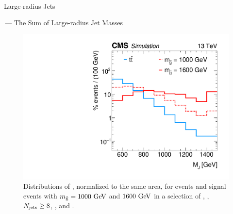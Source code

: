 \begin{section}{Large-radius Jets}
\begin{subsection}{\MJ\,--- The Sum of Large-radius Jet Masses}
\begin{figure}[tbp!]
\centering
\includegraphics[angle=0,width=0.80\columnwidth]{fig/mj_distributions.pdf}
\caption{Distributions of \MJ, normalized to the same area, for \ttbar events and signal events with $m_{\tilde{\mathrm{g}}} = 1000~\mathrm{Ge\kern -0.1em V}$ and $1600~\mathrm{Ge\kern -0.1em V}$ in a selection of \baseNleps, \baseHT, $N_{\mathrm{jets}} \geq 8$, \baseMJ, and \baseNb.}
\label{fig:mj_distributions}
\end{figure}

\end{subsection}

\end{section}
